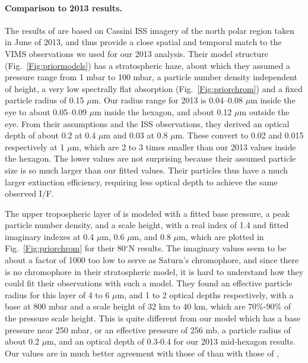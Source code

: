 \documentclass[article,11pt]{emulateapj}
\def\degx{$^\circ$}
\def\mum{$\mu$m }
\def\mumx{$\mu$m}
\begin{document}
\paragraph{Comparison to 2013 results. }
The results of \cite{Sanz-Requena2018} are based on Cassini ISS
imagery of the north polar region taken in June of 2013, and thus
provide a close spatial and temporal match to the VIMS observations we
used for our 2013 analysis. Their model structure
(Fig.\ \ref{Fig:priormodels}) has a stratospheric haze, about which
they assumed a pressure range from 1 mbar to 100 mbar, a particle
number density independent of height, a very low spectrally flat
absorption (Fig.\ \ref{Fig:priorchrom}) and a fixed particle radius of
0.15 \mumx.  Our radius
range for 2013 is 0.04--0.08 \mum inside the eye to about 0.05--0.09
\mum inside the hexagon, and about 0.12 \mum outside the eye.   
From their assumptions and the ISS observations, they derived
an optical depth of about 0.2 at 0.4 \mum and 0.03 at 0.8 \mumx. These
convert to 0.02 and 0.015 respectively at 1 \mumx, which are 2 to 3
times smaller than our 2013 values inside the hexagon. The lower
values are not surprising because their assumed particle
size is so much larger than our fitted values. Their particles
thus have a much larger extinction efficiency, requiring
less optical depth to achieve the same observed I/F.  


The upper tropospheric layer of \cite{Sanz-Requena2018} is modeled
with a fitted base pressure, a peak particle number density, and a
scale height, with a real index of 1.4 and fitted imaginary indexes at
0.4 \mumx, 0.6 \mumx, and 0.8 \mumx, which are plotted in
Fig.\ \ref{Fig:priorchrom} for their 80\degx N results.  The imaginary
values seem to be about a factor of 1000 too low to serve as Saturn's
chromophore, and since there is no chromophore in their stratospheric
model, it is hard to understand how they could fit their observations
with such a model. They found an effective particle radius for this
layer of 4 to 6 \mumx, and 1 to 2 optical depths respectively, with a
base at 800 mbar and a scale height of 32 km to 40 km, which are
70\%-90\% of the pressure scale height.  This is quite different from
our model which has a base pressure near 250 mbar, or an effective
pressure of 256 mb, a particle radius of about 0.2 \mumx, and an
optical depth of 0.3-0.4 for our 2013 mid-hexagon results.  Our values are in much better
agreement with those of \cite{Kark2005} than with those of \cite{Sanz-Requena2018},
\end{document}
